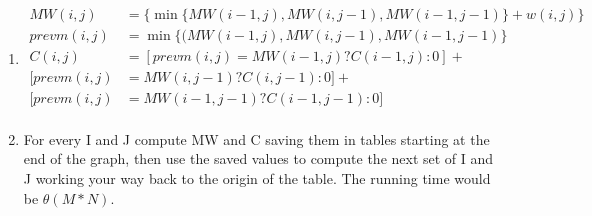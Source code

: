 \documentclass[11pt]{article}
\begin{document}
		
	\newpage
	\\
	\begin{enumerate}
		\item 
		\begin{align}
			MW(i,j) &= \{\min\{MW(i-1,j),MW(i,j-1),MW(i-1,j-1)\} + w(i,j)\}\\
			prevm(i,j) &= \min\{(MW(i-1,j),MW(i,j-1),MW(i-1,j-1)\}\\
			C(i,j) &= [ prevm(i,j) = MW(i-1,j) ? C(i-1,j) : 0 ] +\\
			[ prevm(i,j) &= MW(i,j-1) ? C(i,j-1) : 0 ] +\\
			[ prevm(i,j) &= MW(i-1,j-1) ? C(i-1,j-1) : 0 ] \\
		\end{align}
		\item
		For every I and J compute MW and C saving them in tables starting at the end of the graph, then use the saved values to compute the next set of I and J working your way back to the origin of the table. The running time would be $\theta(M*N)$.		
	\end{enumerate}
	
\end{document}
